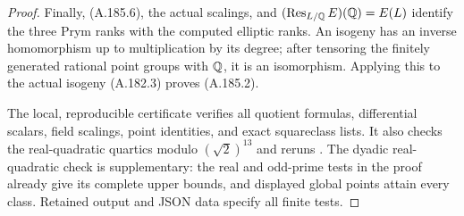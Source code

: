\begin{proof}
Finally, (A.185.6), the actual scalings, and
\((\operatorname{Res}_{L/\mathbb Q}E)(\mathbb Q)=E(L)\) identify the
three Prym ranks with the computed elliptic ranks.  An isogeny
has an inverse homomorphism up to multiplication by its degree;
after tensoring the finitely generated rational point groups
with \(\mathbb Q\), it is an isomorphism.  Applying this to the
actual isogeny (A.182.3) proves (A.185.2).

The local, reproducible certificate
 verifies
all quotient formulas, differential scalars, field scalings,
point identities, and exact squareclass lists.  It also checks
the real-quadratic quartics modulo \((\sqrt2)^{13}\) and
reruns .
The dyadic real-quadratic check is supplementary: the real
and odd-prime tests in the proof already give its complete
upper bounds, and displayed global points attain every class.
Retained output and JSON data specify all finite tests.
\end{proof}
